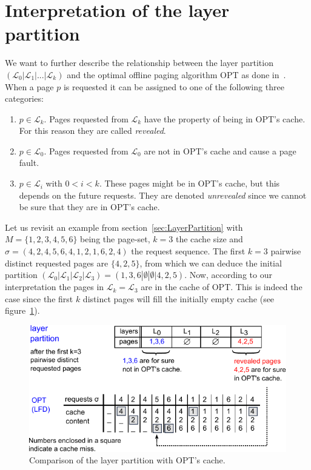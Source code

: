 \documentclass[a4paper,12pt, titlepage]{article}  %
\newcommand{\cl}{\mathcal{L}}   %
\begin{document}
\section{Interpretation of the layer partition}
We want to further describe the relationship between the layer partition $(\cl_0 | \cl_1 | ... | \cl_k)$ and the 
optimal offline paging algorithm OPT as done in~\cite{sea12_paper,moruz_soda12}.  When a page $p$ is requested it can be 
assigned to one of the following three categories:

\begin{enumerate}
 \item $p \in \cl_k$. Pages requested from $\cl_k$ have the property of being 
         in OPT's cache. For this reason they are called \emph{revealed}.

 \item $p \in \cl_0$. Pages requested from $\cl_0$ are not in OPT's cache and
         cause a page fault.

 \item $p \in \cl_i$ with $0<i<k$. These pages might be in OPT's cache, but this depends on the future requests.
         They are denoted \emph{unrevealed} since we cannot be sure that they are in OPT's cache.
\end{enumerate}

\noindent Let us revisit an example from section~\ref{sec:LayerPartition} with 
$M=\{1,2,3,4,5,6\}$ being the page-set, $k=3$ 
the cache size and $\sigma=(4,2,4,5,6,4,1,2,1,6,2,4)$ the request sequence.
The first $k=3$ pairwise distinct requested pages are $\{4,2,5\}$,  from which we can deduce the initial partition 
$(\cl_0 | \cl_1| \cl_2| \cl_3)=(1,3,6|\emptyset|\emptyset|4,2,5)$.
Now, according to our interpretation the pages in $\cl_k = \cl_3$ are in the cache of OPT. This 
is indeed the case since the first $k$ distinct pages will fill the initially empty cache (see figure~\ref{fig:layerPartition_Interpretation1a}). 


\begin{figure}[!htp]
	\begin{center}
	\includegraphics[scale=1.1]{./figures/layerPartition_Interpretation1a.pdf}
	\caption{Comparison of the layer partition with OPT's cache.} 
	\label{fig:layerPartition_Interpretation1a}
        \end{center}
\end{figure}
\end{document}
